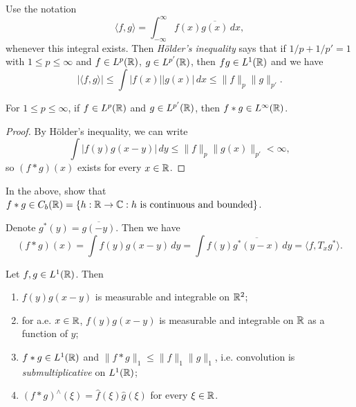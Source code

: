 \begin{remark}
  Use the notation
  \[
    \langle f, g \rangle
    = \int_{-\infty}^\infty
    f(x) \overline{g(x)}\, dx,
  \]
  whenever this integral exists.
  Then \emph{H\"older's inequality}
  says that if $1 / p + 1 / p' = 1$
  with $1 \le p \le \infty$ and
  $f \in L^p(\mathbb{R})$, $g \in L^{p'}(\mathbb{R})$,
  then $fg \in L^1(\mathbb{R})$ and we have
  \[
    |\langle f, g \rangle|
    \le \int |f(x)| |g(x)|\, dx
    \le \|f\|_p \|g\|_{p'}.
  \]
\end{remark}

\begin{theorem}\label{thm:convolution-l-infty}
  For $1 \le p \le \infty$, if
  $f \in L^p(\mathbb{R})$ and
  $g \in L^{p'}(\mathbb{R})$, then
  $f * g \in L^\infty(\mathbb{R})$.
\end{theorem}

\begin{proof}
  By H\"older's inequality, we can write
  \[
    \int |f(y) g(x - y)|\, dy
    \le \|f\|_p \|g(x)\|_{p'}
    < \infty,
  \]
  so $(f * g)(x)$ exists for every $x \in \mathbb{R}$.
\end{proof}

\begin{exercise}\label{ex:conv-cont-bounded}
  In the above,
  show that $f * g \in C_b(\mathbb{R}) = \{h : \mathbb{R} \to \mathbb{C} : h \text{ is continuous and bounded}\}$.
\end{exercise}

\begin{remark}
  Denote $g^*(y) = \overline{g(-y)}$. Then
  we have
  \[
    (f * g)(x)
    = \int f(y) g(x - y)\, dy
    = \int f(y) \overline{g^*(y - x)}\, dy
    = \langle f, T_x g^* \rangle.
  \]
\end{remark}

\begin{theorem}
  Let $f, g \in L^1(\mathbb{R})$. Then
  \begin{enumerate}
    \item $f(y) g(x - y)$ is measurable
      and integrable on $\mathbb{R}^2$;
    \item for a.e. $x \in \mathbb{R}$,
      $f(y) g(x - y)$ is measurable
      and integrable on $\mathbb{R}$ as a
      function of $y$;
    \item $f * g \in L^1(\mathbb{R})$ and
      $\|f * g\|_1 \le \|f\|_1 \|g\|_1$, i.e.
      convolution is
      \emph{submultiplicative} on $L^1(\mathbb{R})$;
    \item $(f * g)^\wedge(\xi) = \widehat{f}(\xi) \widehat{g}(\xi)$ for every $\xi \in \mathbb{R}$.
  \end{enumerate}
\end{theorem}

